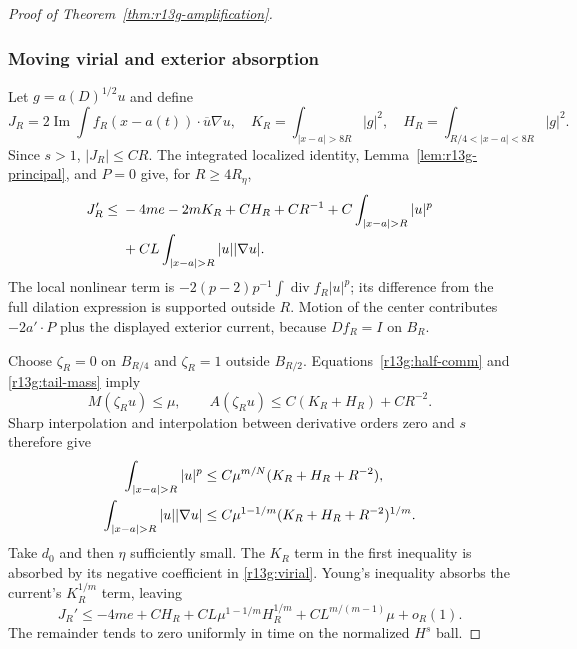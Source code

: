 \begin{proof}[Proof of Theorem~\ref{thm:r13g-amplification}]
\subsubsection*{Moving virial and exterior absorption}
Let $g=a(D)^{1/2}u$ and define
\[
 J_R=2\operatorname{Im}\int f_R(x-a(t))\cdot\overline u\nabla u,
\quad
 K_R=\int_{|x-a|>8R}|g|^2,
\quad
 H_R=\int_{R/4<|x-a|<8R}|g|^2.
\]
Since $s>1$, $|J_R|\le CR$. The integrated localized identity,
Lemma~\ref{lem:r13g-principal}, and $P=0$ give, for $R\ge4R_\eta$,
\begin{align}
 J_R'\le{}&-4me-2mK_R+CH_R+CR^{-1}
  +C\int_{|x-a|>R}|u|^p\notag\\
 &+CL\int_{|x-a|>R}|u||\nabla u|.
 \label{r13g:virial}
\end{align}
The local nonlinear term is
$-2(p-2)p^{-1}\int\operatorname{div}f_R|u|^p$; its difference
from the full dilation expression is supported outside $R$.
Motion of the center contributes $-2a'\cdot P$ plus the displayed
exterior current, because $Df_R=I$ on $B_R$.

Choose $\zeta_R=0$ on $B_{R/4}$ and $\zeta_R=1$ outside
$B_{R/2}$. Equations~\eqref{r13g:half-comm} and
\eqref{r13g:tail-mass} imply
\[
 M(\zeta_Ru)\le\mu,\qquad
 A(\zeta_Ru)\le C(K_R+H_R)+CR^{-2}.
\]
Sharp interpolation and interpolation between derivative orders zero
and $s$ therefore give
\begin{align}
 \int_{|x-a|>R}|u|^p
 &\le C\mu^{m/N}(K_R+H_R+R^{-2}),\notag\\
 \int_{|x-a|>R}|u||\nabla u|
 &\le C\mu^{1-1/m}(K_R+H_R+R^{-2})^{1/m}.
 \label{r13g:tail-bounds}
\end{align}
Take $d_0$ and then $\eta$ sufficiently small. The $K_R$ term in
the first inequality is absorbed by its negative coefficient in
\eqref{r13g:virial}. Young's inequality absorbs the current's
$K_R^{1/m}$ term, leaving
\begin{equation}\label{r13g:averagable}
 J_R'\le -4me+CH_R
    +CL\mu^{1-1/m}H_R^{1/m}
    +CL^{m/(m-1)}\mu+o_R(1).
\end{equation}
The remainder tends to zero uniformly in time on the normalized
$H^s$ ball.


\end{proof}
